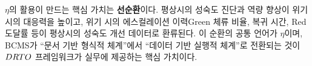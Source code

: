 
\subsubsection{}
\label{subsubsec:virtuous-cycle}

$\eta$의  활용이 만드는 핵심 가치는 \textbf{선순환}이다.
평상시의 성숙도 진단과 역량 향상이 위기 시의 대응력을 높이고,
위기 시의 에스컬레이션 이력\chg{(}Green 체류 비율,
복귀 시간, Red 도달률 등\chg{)}이 평상시의 성숙도 개선 데이터로 환류된다.
이 순환의 공통 언어가 $\eta$이며,
BCMS가 ``문서 기반 형식적 체계''에서 ``데이터 기반 실행적 체계''로
전환되는 것이 $DRTO$ 프레임워크가 실무에 제공하는 핵심 가치이다.

